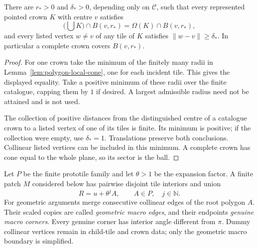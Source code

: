 \begin{lemma}
\label{lem:sector-radius}
There are $r_*>0$ and $\delta_*>0$, depending only on $\mathcal C$, such that
every represented pointed crown $K$ with centre $v$ satisfies
\[
  \bigl(\bigcup K\bigr)\cap B(v,r_*)
       =\Omega(K)\cap B(v,r_*),
\]
and every listed vertex $w\ne v$ of any tile of $K$ satisfies
$\lVert w-v\rVert\ge\delta_*$.  In particular a complete crown covers
$B(v,r_*)$.
\end{lemma}
\begin{proof}
For one crown take the minimum of the finitely many radii in
Lemma~\ref{lem:polygon-local-cone}, one for each incident tile.  This gives
the displayed equality.  Take a positive minimum of these radii over the
finite catalogue, capping them by $1$ if desired.  A largest admissible
radius need not be attained and is not used.

The collection of positive distances from the distinguished centre of a
catalogue crown to a listed vertex of one of its tiles is finite.  Its
minimum is positive; if the collection were empty, use $\delta_*=1$.
Translations preserve both conclusions.  Collinear listed vertices can be
included in this minimum.  A complete crown has cone equal to the whole
plane, so its sector is the ball.
\end{proof}

\begin{definition}
\label{def:macro-boundary}
Let $P$ be the finite prototile family and let $\theta>1$ be the expansion
factor.  A finite patch $M$ considered below has pairwise disjoint tile
interiors and union
\[
 R=u+\theta^j A,\qquad A\in P,\quad j\in\mathbb N.
\]
For geometric arguments merge consecutive collinear edges of the root
polygon $A$.  Their scaled copies are called \emph{geometric macro edges},
and their endpoints \emph{genuine macro corners}.  Every genuine corner
has interior angle different from $\pi$.  Dummy collinear vertices remain
in child-tile and crown data; only the geometric macro boundary is simplified.
\end{definition}


